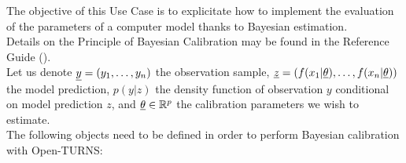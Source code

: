 \renewcommand{\filename}{docUC_InputWithData_BayesianCalibration.tex}
\renewcommand{\filetitle}{UC : Bayesian Calibration of a Computer Code}

\HeaderIIILevel





The objective of this Use Case is to explicitate how to implement the evaluation of the parameters of a computer model thanks to Bayesian estimation.\\


Details on the Principle of Bayesian Calibration may be found in the Reference Guide ().\\

Let us denote ${\underline{y}} = (y_1, \dots, y_n)$ the observation sample, ${\underline{z}} = (f(x_1|{\underline{\theta}}), \ldots, f(x_n|{\underline{\theta}}))$ the model prediction, $p(y |z)$ the density function of observation $y$ conditional on model prediction $z$, and ${\underline{\theta}} \in {\mathbb R}^p$ the calibration parameters we wish to estimate.\\

The following objects need to be defined in order to perform Bayesian calibration with Open-TURNS:

